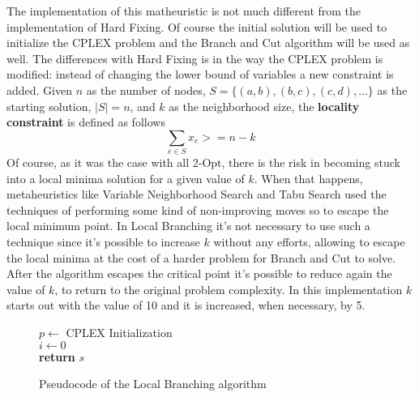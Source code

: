 The implementation of this matheuristic is not much different from the implementation of Hard Fixing.
Of course the initial solution will be used to initialize the CPLEX problem and the Branch and Cut algorithm will be used as well.
The differences with Hard Fixing is in the way the CPLEX problem is modified: instead of changing the lower bound of variables a new constraint is added.
Given $n$ as the number of nodes, $S = \{(a,b),(b,c),(c,d),...\}$ as the starting solution, $|S| = n$, and $k$ as the neighborhood size, the \textbf{locality constraint} is defined as follows
\[
    \sum_{e \in S} x_e >= n-k
\]
Of course, as it was the case with all 2-Opt, there is the risk in becoming stuck into a local minima solution for a given value of $k$.
When that happens, metaheuristics like Variable Neighborhood Search and Tabu Search used the techniques of performing some kind of non-improving moves so to escape the local minimum point.
In Local Branching it's not necessary to use such a technique since it's possible to increase $k$ without any efforts, allowing to escape the local minima at the cost of a harder problem for Branch and Cut to solve.
After the algorithm escapes the critical point it's possible to reduce again the value of $k$, to return to the original problem complexity.
In this implementation $k$ starts out with the value of 10 and it is increased, when necessary, by 5.

\begin{figure}[htbp]
	\begin{algorithm}[H]
		\vspace{2mm}
        $p \gets$ CPLEX Initialization \\
        $i \gets 0$ \\ 
        \textbf{return} $s$
	\end{algorithm}
	\caption{Pseudocode of the Local Branching algorithm} \label{fig:localBranching}
\end{figure}

